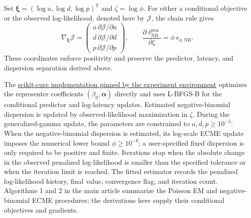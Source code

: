 \documentclass[11pt]{article}
\begin{document}
Set $\bm\xi=(\log a,\log d,\log p)^{\mathsf T}$ and $\zeta=\log\phi$. For either a conditional objective or the observed log-likelihood, denoted here by $\mathcal J$, the chain rule gives
\begin{equation}
\nabla_{\bm\xi}\mathcal J
=\begin{pmatrix}
a\,\partial\mathcal J/\partial a\\
d\,\partial\mathcal J/\partial d\\
p\,\partial\mathcal J/\partial p
\end{pmatrix},
\qquad
\frac{\partial\ell_{\mathrm{NB}}^{\mathrm{pen}}}{\partial\zeta}
=\phi\,s_{\phi,\mathrm{NB}}.
\label{eq:supp-log-parameter-gradients}
\end{equation}
These coordinates enforce positivity and preserve the predictor, latency, and dispersion separation derived above.

The \href{https://github.com/cowvin0/scikit-cure/tree/832dcf1e5022171cb7b7df9996198c4752e00b64}{scikit-cure implementation pinned by the experiment environment} optimizes the representer coefficients $(\beta_0,\bm\alpha)$ directly and uses L-BFGS-B for the conditional predictor and log-latency updates. Estimated negative-binomial dispersion is updated by observed-likelihood maximization in $\zeta$. During the generalized-gamma update, the parameters are constrained to $a,d,p\geq10^{-5}$. When the negative-binomial dispersion is estimated, its log-scale ECME update imposes the numerical lower bound $\phi\geq10^{-8}$; a user-specified fixed dispersion is only required to be positive and finite. Iterations stop when the absolute change in the observed penalized log-likelihood is smaller than the specified tolerance or when the iteration limit is reached. The fitted estimator records the penalized log-likelihood history, final value, convergence flag, and iteration count. Algorithms 1 and 2 in the main article summarize the Poisson EM and negative-binomial ECME procedures; the derivations here supply their conditional objectives and gradients.



\end{document}
